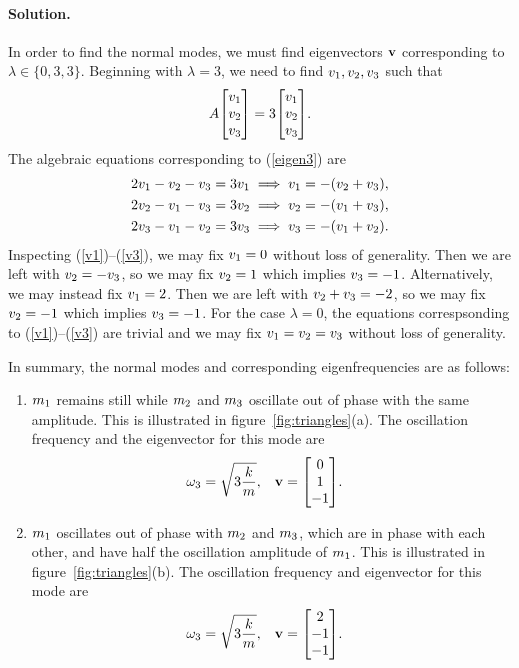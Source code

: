 \documentclass[11pt]{article}
\newcommand{\refeq}[1]{(\ref{#1})}
\newenvironment{solution}
{
    \paragraph{Solution.}
    \ignorespaces
}
{
    \bigskip
}
\begin{document}
\begin{solution}
	In order to find the normal modes, we must find eigenvectors $\mathbf{v}$ corresponding to $\lambda \in \{ 0, 3, 3 \}$.  Beginning with $\lambda = 3$, we need to find $v_1, v_2, v_3$ such that
	\begin{equation} \label{eigen3}
		A \mqty[ \vq \\ \vw \\ \ve ] = 3 \mqty[ \vq \\ \vw \\ \ve ].
	\end{equation}
	The algebraic equations corresponding to \refeq{eigen3} are
	\begin{align}
		2 v_1 - v_2 - v_3 = 3 v_1 &\implies v_1 = -(v_2 + v_3), \label{v1} \\
		2 v_2 - v_1 - v_3 = 3 v_2 &\implies v_2 = -(v_1 + v_3), \label{v2} \\
		2 v_3 - v_1 - v_2 = 3 v_3 &\implies v_3 = -(v_1 + v_2). \label{v3}
	\end{align}
	Inspecting \refeq{v1}--\refeq{v3}, we may fix $v_1 = 0$ without loss of generality.  Then we are left with $v_2 = -v_3$, so we may fix $v_2 = 1$ which implies $v_3 = -1$.  Alternatively, we may instead fix $v_1 = 2$.  Then we are left with $v_2 + v_3 = -2$, so we may fix $v_2 = -1$ which implies $v_3 = -1$.  For the case $\lambda = 0$, the equations correspsonding to \refeq{v1}--\refeq{v3} are trivial and we may fix $v_1 = v_2 = v_3$ without loss of generality.
	
	In summary, the normal modes and corresponding eigenfrequencies are as follows:
	\renewcommand{\theenumi}{\alph{enumi}}
	\begin{enumerate}
		\item $m_1$ remains still while $m_2$ and $m_3$ oscillate out of phase with the same amplitude.  This is illustrated in figure~\ref{fig:triangles}(a).  The oscillation frequency and the eigenvector for this mode are
			\begin{align}
				\ome &= \sqrt{3 \frac{k}{m}}, & \vv &= \mqty[0 \\ 1 \\ -1].
			\end{align}
		
		\item $m_1$ oscillates out of phase with $m_2$ and $m_3$, which are in phase with each other, and have half the oscillation amplitude of $m_1$.  This is illustrated in figure~\ref{fig:triangles}(b).  The oscillation frequency and eigenvector for this mode are
			\begin{align}
				\ome &= \sqrt{3 \frac{k}{m}}, & \vv &= \mqty[2 \\ -1 \\ -1].
			\end{align}
			

\end{enumerate}
\end{solution}
\end{document}
